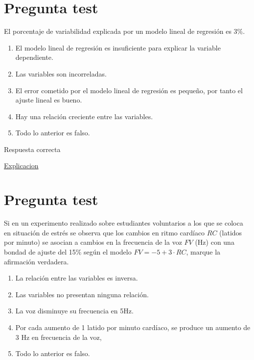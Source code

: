 \documentclass[
]{book}
\providecommand{\tightlist}{%
  \setlength{\itemsep}{0pt}\setlength{\parskip}{0pt}}
\begin{document}
\hypertarget{pregunta-test-146}{%
\section{Pregunta test}\label{pregunta-test-146}}

El porcentaje de variabilidad explicada por un modelo lineal de regresión es 3\%.

\begin{enumerate}
\def\labelenumi{\alph{enumi})}
\tightlist
\item
  El modelo lineal de regresión es insuficiente para explicar la variable dependiente.
\item
  Las variables son incorreladas.
\item
  El error cometido por el modelo lineal de regresión es pequeño, por tanto el ajuste lineal es bueno.
\item
  Hay una relación creciente entre las variables.
\item
  Todo lo anterior es falso.
\end{enumerate}

Respuesta correcta

\href{https://blog.minitab.com/es/analisis-de-regresion-como-puedo-interpretar-el-r-cuadrado-y-evaluar-la-bondad-de-ajuste}{Explicacion}

\hypertarget{pregunta-test-147}{%
\section{Pregunta test}\label{pregunta-test-147}}

Si en un experimento realizado sobre estudiantes voluntarios a los que se coloca en situación de estrés se observa que los cambios en ritmo cardíaco \(RC\) (latidos por minuto) se asocian a cambios en la frecuencia de la voz \(FV\) (Hz) con una bondad de ajuste del 15\% según el modelo \(FV = -5 + 3 \cdot RC\), marque la afirmación verdadera.

\begin{enumerate}
\def\labelenumi{\alph{enumi})}
\tightlist
\item
  La relación entre las variables es inversa.
\item
  Las variables no presentan ninguna relación.
\item
  La voz disminuye su frecuencia en 5Hz.
\item
  Por cada aumento de 1 latido por minuto cardíaco, se produce un aumento de 3 Hz en frecuencia de la voz,
\item
  Todo lo anterior es falso.
\end{enumerate}
\end{document}
